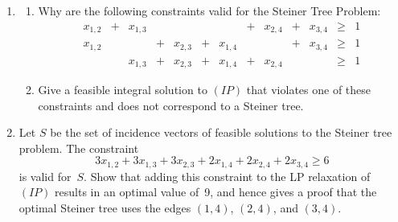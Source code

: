 \documentclass[12pt]{article}
\newcommand{\xab}{\mbox{$x_{1,2}$}}
\newcommand{\xac}{\mbox{$x_{1,3}$}}
\newcommand{\xad}{\mbox{$x_{1,4}$}}
\newcommand{\xbc}{\mbox{$x_{2,3}$}}
\newcommand{\xbd}{\mbox{$x_{2,4}$}}
\newcommand{\xcd}{\mbox{$x_{3,4}$}}
\begin{document}
\begin{enumerate}
\begin{enumerate}
        \item   \label{part14vs23}
        \begin{enumerate}
        \item
        Why are the following constraints valid for the Steiner Tree Problem:
        \begin{displaymath}
        \begin{array}{rcrcrcrcrcrcl}
        \xab & + & \xac &&&&& + & \xbd & + & \xcd & \geq & 1  \\
        \xab &&& + & \xbc & + & \xad &&& + & \xcd & \geq & 1 \\
        && \xac & + & \xbc & + & \xad & + & \xbd &&& \geq & 1
        \end{array}
        \end{displaymath}
        \item
        Give a feasible integral solution to $(IP)$ that violates one of these constraints
        and does not correspond to a Steiner tree.
        \end{enumerate}

         \item  \label{part.sumall}
         Let $S$ be the set of incidence vectors of feasible solutions to the Steiner tree problem.
         The constraint
         \begin{equation}   \label{eqn.sumall}
         3\xab + 3\xac + 3\xbc + 2 \xad + 2 \xbd + 2 \xcd \geq 6
         \end{equation}
         is valid for~$S$.
         Show that adding this constraint to the LP relaxation of $(IP)$ results in
         an optimal value of~9, and hence gives a proof that the optimal Steiner tree
         uses the edges $(1,4)$, $(2,4)$, and $(3,4)$.
         

\end{enumerate}
\end{enumerate}
\end{document}
